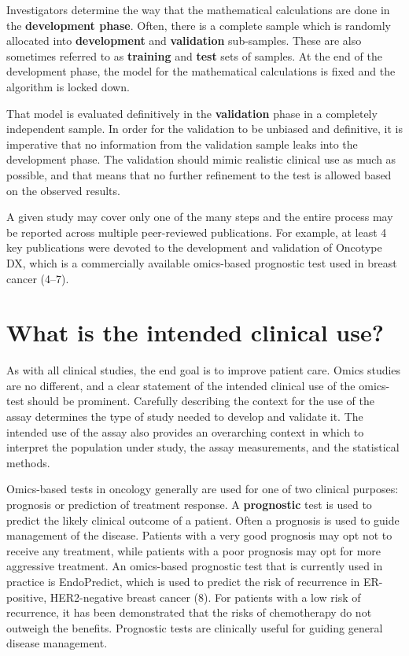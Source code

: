 \documentclass[11pt]{article}
\begin{document}
Investigators determine the way that the mathematical calculations are
done in the \textbf{development phase}. Often, there is a complete
sample which is randomly allocated into \textbf{development} and
\textbf{validation} sub-samples. These are also sometimes referred to as
\textbf{training} and \textbf{test} sets of samples. At the end of the
development phase, the model for the mathematical calculations is fixed
and the algorithm is locked down.

That model is evaluated definitively in the \textbf{validation} phase in
a completely independent sample. In order for the validation to be
unbiased and definitive, it is imperative that no information from the
validation sample leaks into the development phase. The validation
should mimic realistic clinical use as much as possible, and that means
that no further refinement to the test is allowed based on the observed
results.

A given study may cover only one of the many steps and the entire
process may be reported across multiple peer-reviewed publications. For
example, at least 4 key publications were devoted to the development and
validation of Oncotype DX, which is a commercially available omics-based
prognostic test used in breast cancer (4--7).

\section{What is the intended clinical
use?}\label{what-is-the-intended-clinical-use}

As with all clinical studies, the end goal is to improve patient care.
Omics studies are no different, and a clear statement of the intended
clinical use of the omics-test should be prominent. Carefully describing
the context for the use of the assay determines the type of study needed
to develop and validate it. The intended use of the assay also provides
an overarching context in which to interpret the population under study,
the assay measurements, and the statistical methods.

Omics-based tests in oncology generally are used for one of two clinical
purposes: prognosis or prediction of treatment response. A
\textbf{prognostic} test is used to predict the likely clinical outcome
of a patient. Often a prognosis is used to guide management of the
disease. Patients with a very good prognosis may opt not to receive any
treatment, while patients with a poor prognosis may opt for more
aggressive treatment. An omics-based prognostic test that is currently
used in practice is EndoPredict, which is used to predict the risk of
recurrence in ER-positive, HER2-negative breast cancer (8). For patients
with a low risk of recurrence, it has been demonstrated that the risks
of chemotherapy do not outweigh the benefits. Prognostic tests are
clinically useful for guiding general disease management.
\end{document}
